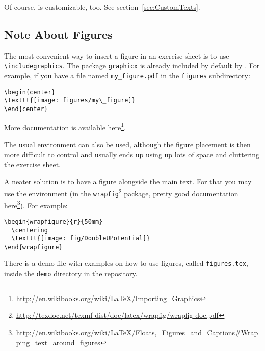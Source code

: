 \documentclass[11pt,a4paper]{article}
\begin{document}
\begin{pkgtip}
  Of course,  is customizable, too. See section~\ref{sec:CustomTexts}.
\end{pkgtip}

\subsection{Note About Figures}

The most convenient way to insert a figure in an exercise sheet is to use
\verb|\includegraphics|. The package \texttt{graphicx} is already included by default by
\ethuebung{}. For example, if you have a file named \verb|my_figure.pdf| in the
\verb|figures| subdirectory:
\begin{pkgverbatim}
\begin{verbatim}
\begin{center}
\texttt{[image: figures/my\_figure]}
\end{center}
\end{verbatim}
\end{pkgverbatim}

More documentation is available
here\footnote{\url{http://en.wikibooks.org/wiki/LaTeX/Importing_Graphics}}.

The usual  environment can also be used, although the figure placement is
then more difficult to control and usually ends up using up lots of space and cluttering
the exercise sheet.

A neater solution is to have a figure alongside the main text. For that you may use the
 environment (in the
\texttt{wrapfig}\footnote{\url{http://texdoc.net/texmf-dist/doc/latex/wrapfig/wrapfig-doc.pdf}}
package, pretty good documentation
here\footnote{\url{http://en.wikibooks.org/wiki/LaTeX/Floats,_Figures_and_Captions\#Wrapping_text_around_figures}}).
For example:
\begin{pkgverbatim}
\begin{verbatim}
\begin{wrapfigure}{r}{50mm}
  \centering
  \texttt{[image: fig/DoubleUPotential]}
\end{wrapfigure}
\end{verbatim}
\end{pkgverbatim}

There is a demo file with examples on how to use figures, called \verb|figures.tex|,
inside the \verb|demo| directory in the \ethuebung{} repository.
\end{document}
